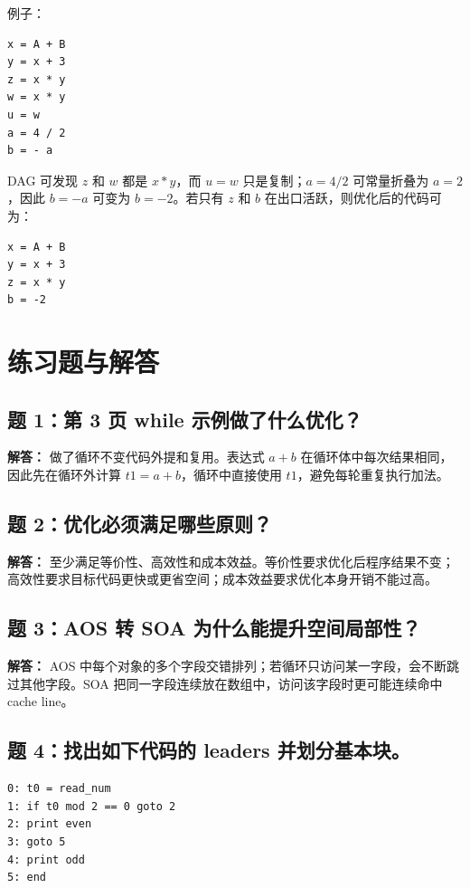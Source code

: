 \documentclass[UTF8,fontset=none,11pt]{ctexart}
\begin{document}
例子：

\begin{verbatim}
x = A + B
y = x + 3
z = x * y
w = x * y
u = w
a = 4 / 2
b = - a
\end{verbatim}

DAG 可发现 \(z\) 和 \(w\) 都是 \(x*y\)，而 \(u=w\) 只是复制；\(a=4/2\) 可常量折叠为 \(a=2\)，因此 \(b=-a\) 可变为 \(b=-2\)。若只有 \(z\) 和 \(b\) 在出口活跃，则优化后的代码可为：

\begin{verbatim}
x = A + B
y = x + 3
z = x * y
b = -2
\end{verbatim}

\section{练习题与解答}

\subsection*{题 1：第 3 页 while 示例做了什么优化？}

\textbf{解答：} 做了循环不变代码外提和复用。表达式 \(a+b\) 在循环体中每次结果相同，因此先在循环外计算 \(t1=a+b\)，循环中直接使用 \(t1\)，避免每轮重复执行加法。

\subsection*{题 2：优化必须满足哪些原则？}

\textbf{解答：} 至少满足等价性、高效性和成本效益。等价性要求优化后程序结果不变；高效性要求目标代码更快或更省空间；成本效益要求优化本身开销不能过高。

\subsection*{题 3：AOS 转 SOA 为什么能提升空间局部性？}

\textbf{解答：} AOS 中每个对象的多个字段交错排列；若循环只访问某一字段，会不断跳过其他字段。SOA 把同一字段连续放在数组中，访问该字段时更可能连续命中 cache line。

\subsection*{题 4：找出如下代码的 leaders 并划分基本块。}

\begin{verbatim}
0: t0 = read_num
1: if t0 mod 2 == 0 goto 2
2: print even
3: goto 5
4: print odd
5: end
\end{verbatim}
\end{document}
